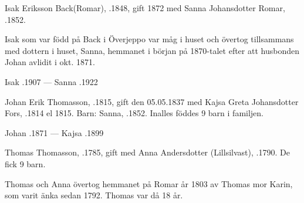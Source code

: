 %
Isak Eriksson Back(Romar), .1848, gift 1872 med Sanna Johansdotter Romar, .1852.
\begin{jhchildren}
  \item {}
  \item {}
  \item {}
  \item {}
  \item {}
  \item {}
  \item {}
\end{jhchildren}
Isak som var född på Back i Överjeppo var måg i huset och övertog tillsammans med dottern i huset, Sanna, hemmanet i början på 1870-talet efter att husbonden Johan avlidit i okt. 1871.

Isak .1907  ---  Sanna .1922


%
Johan Erik Thomasson, .1815, gift den 05.05.1837 med Kajsa Greta Johansdotter Fors, .1814 el 1815.
Barn: Sanna, .1852. Inalles föddes 9 barn i familjen.

Johan .1871  ---  Kajsa .1899


%
Thomas Thomasson, .1785, gift med Anna Andersdotter (Lillsilvast), .1790. De fick 9 barn.
\begin{jhchildren}
  \item {}
  \item {}
\end{jhchildren}
Thomas och Anna övertog hemmanet på Romar år 1803 av Thomas mor Karin, som varit änka sedan 1792. Thomas var då 18 år.

